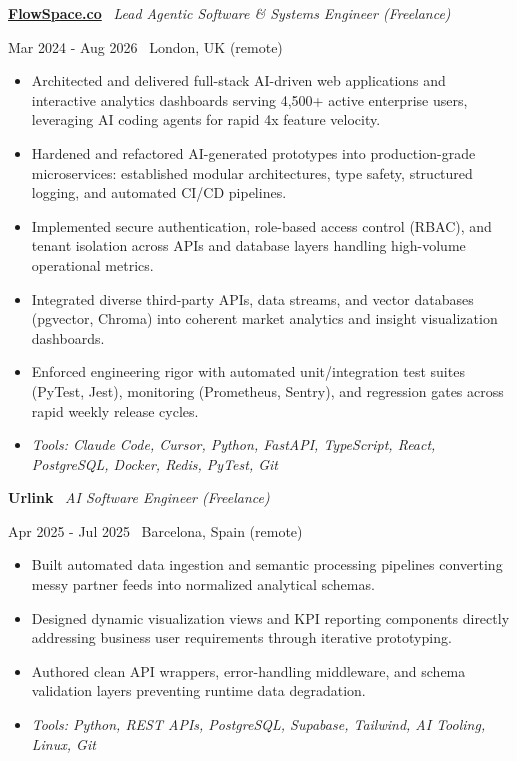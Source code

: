 \documentclass[a4paper,10pt]{article}
\newcommand{\role}[4]{%
  \vspace{2pt}\noindent
  \begin{minipage}[t]{0.70\textwidth}\raggedright\textbf{#1} \textbullet\ \textit{#3}\end{minipage}%
  \hfill
  \begin{minipage}[t]{0.28\textwidth}\raggedleft\footnotesize\color{gray}#2 \textbullet\ #4\end{minipage}%
  \vspace{1pt}%
}
\begin{document}
\role{\href{https://flowspace.co}{FlowSpace.co}}{Mar 2024 - Aug 2026}{Lead Agentic Software \& Systems Engineer (Freelance)}{London, UK (remote)}
\begin{itemize}
  \item Architected and delivered full-stack AI-driven web applications and interactive analytics dashboards serving 4,500+ active enterprise users, leveraging AI coding agents for rapid 4x feature velocity.
  \item Hardened and refactored AI-generated prototypes into production-grade microservices: established modular architectures, type safety, structured logging, and automated CI/CD pipelines.
  \item Implemented secure authentication, role-based access control (RBAC), and tenant isolation across APIs and database layers handling high-volume operational metrics.
  \item Integrated diverse third-party APIs, data streams, and vector databases (pgvector, Chroma) into coherent market analytics and insight visualization dashboards.
  \item Enforced engineering rigor with automated unit/integration test suites (PyTest, Jest), monitoring (Prometheus, Sentry), and regression gates across rapid weekly release cycles.
  \item \textit{Tools: Claude Code, Cursor, Python, FastAPI, TypeScript, React, PostgreSQL, Docker, Redis, PyTest, Git}
\end{itemize}

\role{Urlink}{Apr 2025 - Jul 2025}{AI Software Engineer (Freelance)}{Barcelona, Spain (remote)}
\begin{itemize}
  \item Built automated data ingestion and semantic processing pipelines converting messy partner feeds into normalized analytical schemas.
  \item Designed dynamic visualization views and KPI reporting components directly addressing business user requirements through iterative prototyping.
  \item Authored clean API wrappers, error-handling middleware, and schema validation layers preventing runtime data degradation.
  \item \textit{Tools: Python, REST APIs, PostgreSQL, Supabase, Tailwind, AI Tooling, Linux, Git}
\end{itemize}
\end{document}
